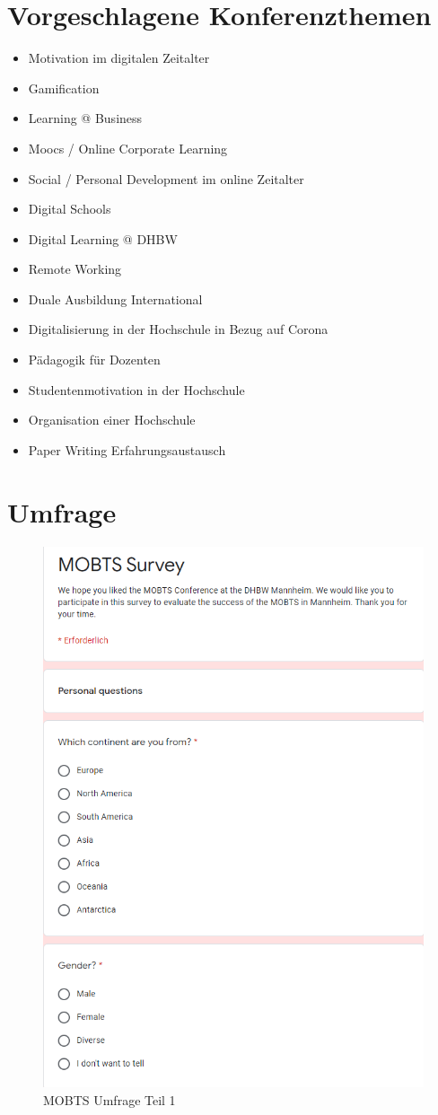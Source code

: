 \chapter{Vorgeschlagene Konferenzthemen}
\label{app:konferenzthemen}
\begin{itemize}
	\item Motivation im digitalen Zeitalter
	\item Gamification
	\item Learning @ Business
	\item Moocs / Online Corporate Learning
	\item Social / Personal Development im online Zeitalter
	\item Digital Schools
	\item Digital Learning @ DHBW
	\item Remote Working
	\item Duale Ausbildung International
	\item Digitalisierung in der Hochschule in Bezug auf Corona
	\item Pädagogik für Dozenten
	\item Studentenmotivation in der Hochschule
	\item Organisation einer Hochschule
	\item Paper Writing Erfahrungsaustausch
\end{itemize}

\chapter{Umfrage}
\label{app:umfrage}
\begin{figure}[h]
	\centering
	\includegraphics[width=10 cm]{img/survey1.png}
	\caption[MOBTS Umfrage]{MOBTS Umfrage Teil 1}
	\label{fig:survey1}
\end{figure}

